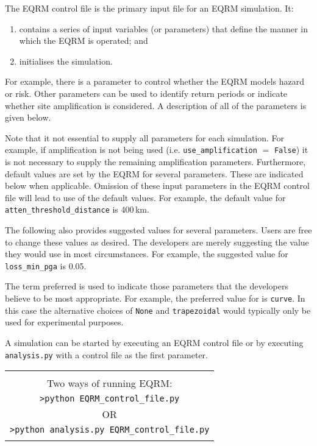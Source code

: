 
The EQRM control file is the primary input file for an EQRM
simulation. It:
\begin{enumerate}
\item contains a series of input variables (or parameters) that define
the manner in which the EQRM is operated; and
\item initialises the simulation.
\end{enumerate}
For example, there is a parameter to control whether the EQRM models
hazard or risk. Other parameters can be used to identify return 
periods or indicate whether site amplification is considered. A
description of all of the parameters is given below.

Note that it not essential to supply all parameters for each
simulation. For example, if amplification is not being used (i.e.
\texttt{use\_amplification} $=$ \texttt{False}) it is not necessary
to supply the remaining amplification parameters. Furthermore,
default values are set by the EQRM for several parameters. These are
indicated below when applicable. Omission of these input
parameters in the EQRM control file will lead to use of the
default values. For example, the default value for
\texttt{atten\_threshold\_distance} is 400\,km.

The following also provides suggested values for several parameters.
Users are free to change these values as desired. The developers are
merely suggesting the value they would use in most circumstances.
For example, the suggested value for \texttt{loss\_min\_pga} is
0.05.

The term preferred is used to indicate those parameters
that the developers believe to be most appropriate. For example,
the preferred value for  is
\texttt{curve}. In this case the alternative choices of
\texttt{None} and \texttt{trapezoidal} would typically only be used for
experimental purposes.

A simulation can be started by executing an EQRM control file or by
executing \texttt{analysis.py} with a control file as the first
parameter.  


\begin{center}
\begin{tabular}{|c|}
\hline
 \\
 Two ways of running EQRM:\\
\texttt{>python EQRM\_control\_file.py}\\
OR\\
\texttt{>python analysis.py EQRM\_control\_file.py}\\
\\
\hline
\end{tabular}
\end{center}

